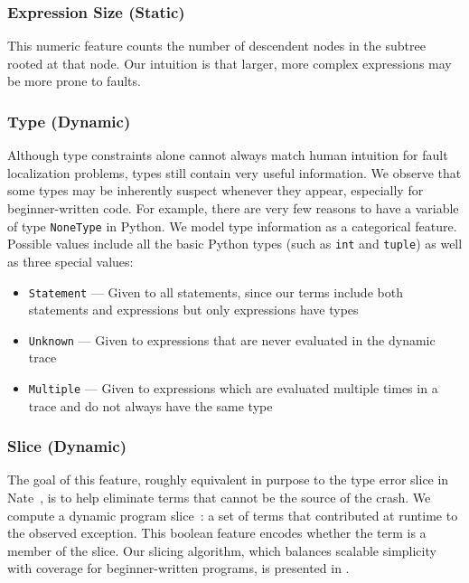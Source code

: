 \documentclass[conference]{IEEEtran}
\newcommand\lt[1]{{\lstinline|#1|}}
\begin{document}
\subsubsection{Expression Size (Static)}

This numeric feature counts the number of descendent nodes in the subtree
rooted at that node. Our intuition is that larger, more complex expressions
may be more prone to faults.

\subsubsection{Type (Dynamic)}

Although type constraints alone cannot always match human intuition for
fault localization problems, types still contain very useful information.
We observe that some types may be inherently suspect whenever they appear,
especially for beginner-written code. For example, there are very few
reasons to have a variable of type \lt{NoneType} in Python. We model
type information as a categorical feature. Possible
values include all the basic Python types (such as \lt{int}
and \lt{tuple}) as well as three special values:
\begin{itemize}
    \item \lt{Statement} --- Given to all statements, since our terms
    include both statements and expressions but only expressions
    have types
    \item \lt{Unknown} --- Given to expressions that are never evaluated in the dynamic
    trace
    \item \lt{Multiple} --- Given to expressions which are evaluated multiple times in
    a trace and do not always have the same type
\end{itemize}

\subsubsection{Slice (Dynamic)}
The goal of this feature, roughly equivalent in purpose to the type error
slice in Nate~\cite{learning-to-blame}, is to help eliminate terms that
cannot be the source of the crash. We compute a dynamic program
slice~\cite{KOREL1988155}: a set of terms that contributed at runtime to
the observed exception. This boolean feature encodes whether the term
is a member of the slice. Our slicing algorithm, which balances scalable
simplicity with coverage for beginner-written programs, is presented in
.
\end{document}
